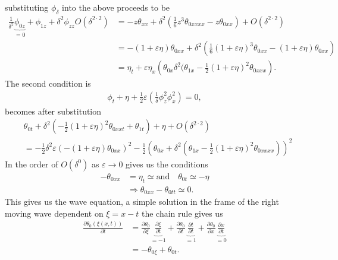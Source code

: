 substituting $\phi_\delta$ into the above proceeds to be
\begin{align}
    \frac{1}{\delta^2}\underbrace{\phi_{0z}}_{=0} + \phi_{1z}+ \delta^2\phi_{zz}
    O(\delta^{2\cdot 2})
    &= -z\theta_{x x} + \delta^2\left( \frac{1}{6}z^3\theta_{0 x x x x} - z
    \theta_{0x x} \right) + O(\delta^{2\cdot 2})\\
    &=-(1+\varepsilon\eta)\theta_{0 x x} + \delta^2\left(
    \frac{1}{6}(1+\varepsilon\eta)^3\theta_{0 x x} -
(1+\varepsilon\eta)\theta_{0 x x} \right) \label{eq:soliton-scale-boundary1}\\
    &= \eta_t + \varepsilon\eta_x \left(
        \theta_{0x}
    \delta^2(\theta_{1x}-\frac{1}{2}( 1+ \varepsilon\eta)^2 \theta_{0x x
    x}\label{eq:soliton-scale-boundary2}
\right).
\end{align}
The second condition is
\begin{align}
    \phi_t + \eta + \frac{1}{2}\varepsilon \left( \frac{1}{\delta}\phi^2_z
    \phi_x^2\right)  = 0,
\end{align}
becomes after substitution
\begin{align}
    &\theta_{0t}+ \delta^2\left( -\frac{1}{2}(1+\varepsilon\eta)^2\theta_{0 x xt}
    + \theta_{1t}\right) + \eta + O(\delta^{2\cdot 2})
\label{eq:soliton-scale-boundary3}
    \\&=-\frac{1}{2}\delta^2\varepsilon(-(1+\varepsilon\eta)\theta_{0 x x
    })^2\label{eq:soliton-scale-boundary4}
    -\frac{1}{2}\left( \theta_{0 x} + \delta^2\left( \theta_{1x} -
    \frac{1}{2}(1+\varepsilon\eta)^2\theta_{0 x x x x}  \right)  \right) ^2
\end{align}
In the order of $O(\delta^{0})$ as $\varepsilon \rightarrow 0$ gives us the conditions
\begin{align}
    -\theta_{0 x x} &= \eta_t \simeq \text{and}\quad
    \theta_{0t}\simeq-\eta\label{eq:solitonO0}\\
    &\Rightarrow \theta_{0 x x} - \theta_{0 t t} \simeq 0.
\end{align}
This gives us the wave equation, a simple solution in the frame of the right
moving wave dependent on $\xi = x -t$ the chain rule gives us
\begin{align}
    \frac{\partial \theta_0(\xi(x, t))}{\partial t}
    &= \frac{\partial
    \theta_0}{\partial \xi} \underbrace{\frac{\partial \xi}{\partial t}}_{=-1}
    + \frac{\partial
    \theta_0}{\partial t} \underbrace{\frac{\partial t}{\partial t}}_{=1}
        + \frac{\partial \theta_0}{\partial x} \underbrace{\frac{\partial
        x}{\partial t}}_{=0}\\
    &=-\theta_{0\xi}+\theta_{0t}.
\end{align}
